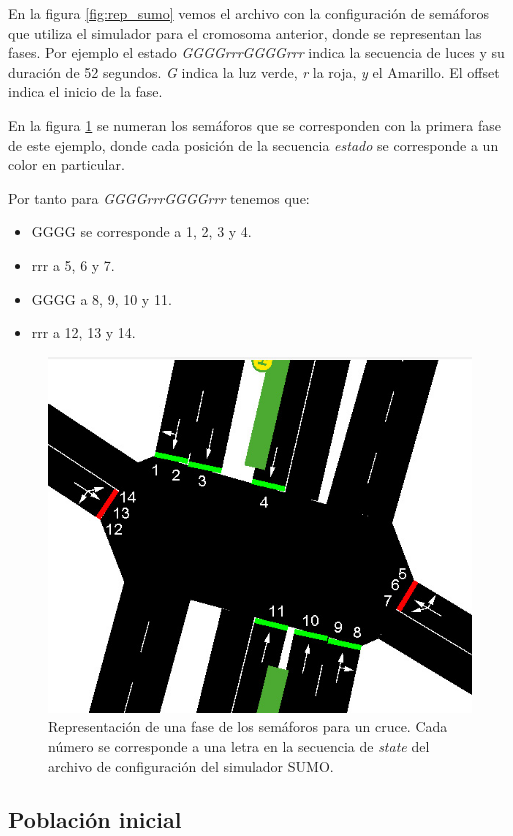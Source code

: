En la figura \ref{fig:rep_sumo} vemos el archivo con la configuración de semáforos que utiliza el simulador para el cromosoma anterior, donde se representan las fases. Por ejemplo el estado \emph{GGGGrrrGGGGrrr} indica la secuencia de luces y su duración de 52 segundos. \emph{G} indica la luz verde, \emph{r} la roja, \emph{y} el Amarillo. El offset indica el inicio de la fase. 

En la figura \ref{fig:sem_numerados} se numeran los semáforos que se corresponden con la primera fase de este ejemplo, donde cada posición de la secuencia \emph{estado} se corresponde a un color en particular. 
\newpage

Por tanto para \emph{GGGGrrrGGGGrrr} tenemos que:
\begin{itemize}
\item GGGG se corresponde a 1, 2, 3 y 4. 
\item rrr a 5, 6 y 7. 
\item GGGG a 8, 9, 10 y 11. 
\item rrr a 12, 13 y 14. 
\end{itemize}
  




\begin{figure}[H]
	\centering
	\includegraphics[width=0.7\linewidth]{Figures/semaforos_numerado}
	\caption{Representación de una fase de los semáforos para un cruce. Cada número se corresponde a una letra en la secuencia de \emph{state} del archivo de configuración del simulador SUMO.}
	\label{fig:sem_numerados}
\end{figure}

\subsection{Población inicial}

